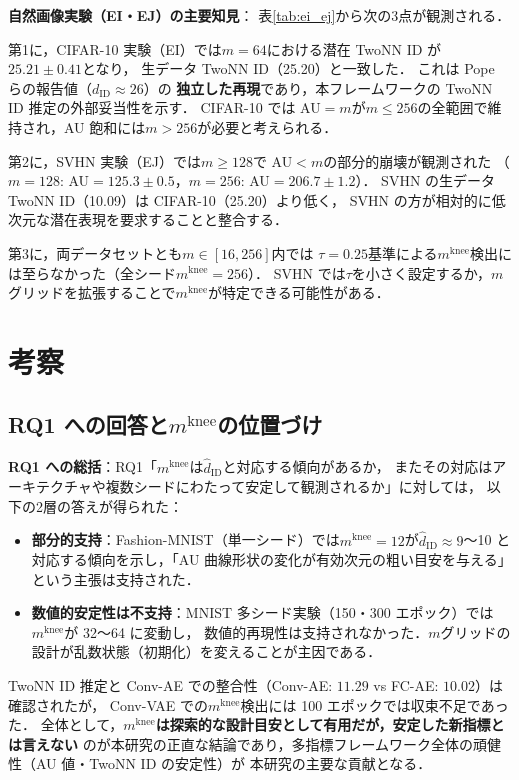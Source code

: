 \documentclass[11pt,a4paper]{jsarticle}
\newcommand{\mknee}{m^{\mathrm{knee}}}
\begin{document}
\textbf{自然画像実験（EI・EJ）の主要知見}：
表\ref{tab:ei_ej}から次の3点が観測される．

第1に，CIFAR-10 実験（EI）では$m=64$における潜在 TwoNN ID が$25.21\pm0.41$となり，
生データ TwoNN ID（25.20）と一致した．
これは Pope ら\cite{pope2021intrinsic}の報告値（$d_\mathrm{ID} \approx 26$）の
\textbf{独立した再現}であり，本フレームワークの TwoNN ID 推定の外部妥当性を示す．
CIFAR-10 では AU$=m$が$m \leq 256$の全範囲で維持され，AU 飽和には$m > 256$が必要と考えられる．

第2に，SVHN 実験（EJ）では$m \geq 128$で AU$<m$の部分的崩壊が観測された
（$m=128$: AU$=125.3\pm0.5$，$m=256$: AU$=206.7\pm1.2$）．
SVHN の生データ TwoNN ID（10.09）は CIFAR-10（25.20）より低く，
SVHN の方が相対的に低次元な潜在表現を要求することと整合する．

第3に，両データセットとも$m \in [16,256]$内では $\tau=0.25$基準による$\mknee$検出には至らなかった（全シード$\mknee=256$）．
SVHN では$\tau$を小さく設定するか，$m$グリッドを拡張することで$\mknee$が特定できる可能性がある．

\section{考察}\label{sec:discussion}

\subsection{RQ1 への回答と$\mknee$の位置づけ}\label{sec:disc_mknee}

\textbf{RQ1 への総括}：RQ1「$\mknee$は$\hat{d}_\mathrm{ID}$と対応する傾向があるか，
またその対応はアーキテクチャや複数シードにわたって安定して観測されるか」に対しては，
以下の2層の答えが得られた：

\begin{itemize}
  \item \textbf{部分的支持}：Fashion-MNIST（単一シード）では$\mknee = 12$が$\hat{d}_\mathrm{ID} \approx 9$〜10
        と対応する傾向を示し，「AU 曲線形状の変化が有効次元の粗い目安を与える」という主張は支持された．
  \item \textbf{数値的安定性は不支持}：MNIST 多シード実験（150・300 エポック）では$\mknee$が 32〜64 に変動し，
        数値的再現性は支持されなかった．$m$グリッドの設計が乱数状態（初期化）を変えることが主因である．
\end{itemize}

TwoNN ID 推定と Conv-AE での整合性（Conv-AE: $11.29$ vs FC-AE: $10.02$）は確認されたが，
Conv-VAE での$\mknee$検出には 100 エポックでは収束不足であった．
全体として，\textbf{$\mknee$は探索的な設計目安として有用だが，安定した新指標とは言えない}
のが本研究の正直な結論であり，多指標フレームワーク全体の頑健性（AU 値・TwoNN ID の安定性）が
本研究の主要な貢献となる．
\end{document}
